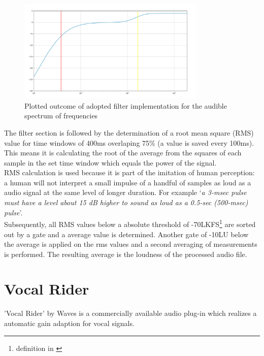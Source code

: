 \begin{figure}[H]
\includegraphics[width=0.8\textwidth]{images/filter_test}
	\centering
	\caption{Plotted outcome of adopted filter implementation for the audible spectrum of frequencies}
	\label{filterTest}
\end{figure}

The filter section is followed by the determination of a root mean square (RMS) value for time windows of 400ms overlaping 75\% (a value is saved every 100ms). This means it is calculating the root of the average from the squares of each sample in the set time window which equals the power of the signal.\\
RMS calculation is used because it is part of the imitation of human perception: a human will not interpret a small impulse of a handful of samples as loud as a audio signal at the same level of longer duration.  For example ‘\textit{a 3-msec pulse must have a level about 15 dB higher to sound as loud as a 0.5-sec (500-msec) pulse}'\cite{masterHA}.\\
Subsequently, all RMS values below a absolute threshold of -70LKFS\footnote{definition in \cite{ITUalgo}} are sorted out by a gate and a average value is determined. Another gate of -10LU below the average is applied on the rms values and a second averaging of measurements is performed. The resulting average is the loudness of the processed audio file.\\

\section{Vocal Rider}

'Vocal Rider' by Waves is a commercially available audio plug-in which realizes a automatic gain adaption for vocal signals.

